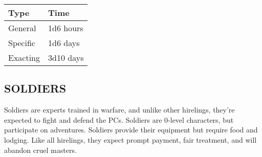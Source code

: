 \begin{multicols}{2}
\begin{minipage}{\columnwidth}
\end{minipage}

\noindent
\begin{minipage}{\columnwidth}

\label{researchtime}
\noindent
\begin{tabular}{|p{}|p{}|}
\hline
Type	& Time \\
\hline\hline
\rowcolor[gray]{.9}General	& 1d6 hours \\
Specific	& 1d6 days \\
\rowcolor[gray]{.9}Exacting	& 3d10 days \\
\hline
\end{tabular}

\end{minipage}

\subsection{SOLDIERS}

Soldiers are experts trained in warfare, and unlike other hirelings, they're expected to fight and defend the PCs.  Soldiers are 0-level characters, but participate on adventures.  Soldiers provide their equipment but require food and lodging.  Like all hirelings, they expect prompt payment, fair treatment, and will abandon cruel masters.

\noindent
\begin{minipage}{\columnwidth}


\end{minipage}
\end{multicols}

